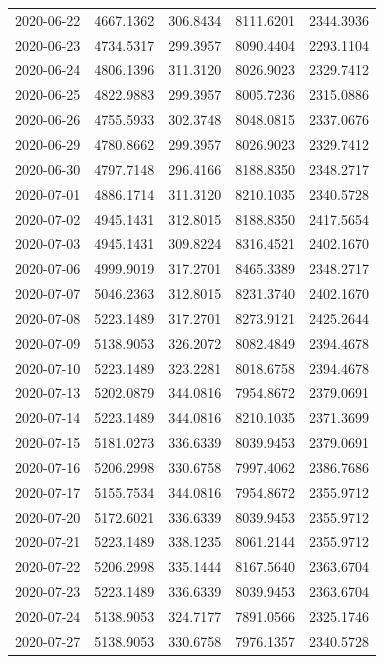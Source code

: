 \begin{footnotesize}
\begin{longtable}{lllll}
2020-06-22 & 4667.1362 & 306.8434 & 8111.6201 & 2344.3936 \\
2020-06-23 & 4734.5317 & 299.3957 & 8090.4404 & 2293.1104 \\
2020-06-24 & 4806.1396 & 311.3120 & 8026.9023 & 2329.7412 \\
2020-06-25 & 4822.9883 & 299.3957 & 8005.7236 & 2315.0886 \\
2020-06-26 & 4755.5933 & 302.3748 & 8048.0815 & 2337.0676 \\
2020-06-29 & 4780.8662 & 299.3957 & 8026.9023 & 2329.7412 \\
2020-06-30 & 4797.7148 & 296.4166 & 8188.8350 & 2348.2717 \\
2020-07-01 & 4886.1714 & 311.3120 & 8210.1035 & 2340.5728 \\
2020-07-02 & 4945.1431 & 312.8015 & 8188.8350 & 2417.5654 \\
2020-07-03 & 4945.1431 & 309.8224 & 8316.4521 & 2402.1670 \\
2020-07-06 & 4999.9019 & 317.2701 & 8465.3389 & 2348.2717 \\
2020-07-07 & 5046.2363 & 312.8015 & 8231.3740 & 2402.1670 \\
2020-07-08 & 5223.1489 & 317.2701 & 8273.9121 & 2425.2644 \\
2020-07-09 & 5138.9053 & 326.2072 & 8082.4849 & 2394.4678 \\
2020-07-10 & 5223.1489 & 323.2281 & 8018.6758 & 2394.4678 \\
2020-07-13 & 5202.0879 & 344.0816 & 7954.8672 & 2379.0691 \\
2020-07-14 & 5223.1489 & 344.0816 & 8210.1035 & 2371.3699 \\
2020-07-15 & 5181.0273 & 336.6339 & 8039.9453 & 2379.0691 \\
2020-07-16 & 5206.2998 & 330.6758 & 7997.4062 & 2386.7686 \\
2020-07-17 & 5155.7534 & 344.0816 & 7954.8672 & 2355.9712 \\
2020-07-20 & 5172.6021 & 336.6339 & 8039.9453 & 2355.9712 \\
2020-07-21 & 5223.1489 & 338.1235 & 8061.2144 & 2355.9712 \\
2020-07-22 & 5206.2998 & 335.1444 & 8167.5640 & 2363.6704 \\
2020-07-23 & 5223.1489 & 336.6339 & 8039.9453 & 2363.6704 \\
2020-07-24 & 5138.9053 & 324.7177 & 7891.0566 & 2325.1746 \\
2020-07-27 & 5138.9053 & 330.6758 & 7976.1357 & 2340.5728 \\

\end{longtable}
\end{footnotesize}
